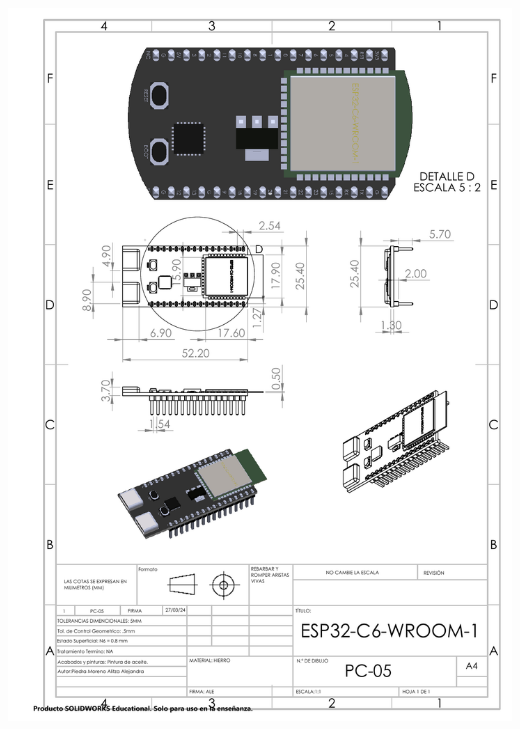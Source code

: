 \begin{center}
\includegraphics[width=.9\textwidth]{22/img/esp32Dibujo.pdf}~\\[15cm]

\end{center}




